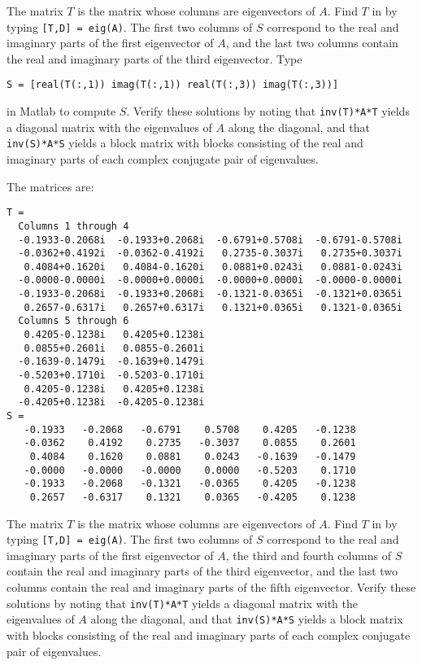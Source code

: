 \documentclass{ximera}
\begin{document}
\soln The matrix $T$ is the matrix whose columns are eigenvectors of $A$. 
Find $T$ in \Matlab by typing {\tt [T,D] = eig(A)}.  The first two columns
of $S$ correspond to the real and imaginary parts of the first eigenvector
of $A$, and the last two columns contain the real and imaginary parts of
the third eigenvector.  Type 
\begin{verbatim}
S = [real(T(:,1)) imag(T(:,1)) real(T(:,3)) imag(T(:,3))]   
\end{verbatim}
in Matlab to compute $S$.  Verify these solutions by noting that
{\tt inv(T)*A*T} yields a diagonal matrix with the eigenvalues of $A$
along the diagonal, and that {\tt inv(S)*A*S} yields a block matrix
with blocks consisting of the real and imaginary parts of each complex
conjugate pair of eigenvalues.

\newpage
{}
\ans The matrices are:
\begin{verbatim}
T =
  Columns 1 through 4 
  -0.1933-0.2068i  -0.1933+0.2068i  -0.6791+0.5708i  -0.6791-0.5708i
  -0.0362+0.4192i  -0.0362-0.4192i   0.2735-0.3037i   0.2735+0.3037i
   0.4084+0.1620i   0.4084-0.1620i   0.0881+0.0243i   0.0881-0.0243i
  -0.0000-0.0000i  -0.0000+0.0000i  -0.0000+0.0000i  -0.0000-0.0000i
  -0.1933-0.2068i  -0.1933+0.2068i  -0.1321-0.0365i  -0.1321+0.0365i
   0.2657-0.6317i   0.2657+0.6317i   0.1321+0.0365i   0.1321-0.0365i
  Columns 5 through 6 
   0.4205-0.1238i   0.4205+0.1238i
   0.0855+0.2601i   0.0855-0.2601i
  -0.1639-0.1479i  -0.1639+0.1479i
  -0.5203+0.1710i  -0.5203-0.1710i
   0.4205-0.1238i   0.4205+0.1238i
  -0.4205+0.1238i  -0.4205-0.1238i
S =
   -0.1933   -0.2068   -0.6791    0.5708    0.4205   -0.1238
   -0.0362    0.4192    0.2735   -0.3037    0.0855    0.2601
    0.4084    0.1620    0.0881    0.0243   -0.1639   -0.1479
   -0.0000   -0.0000   -0.0000    0.0000   -0.5203    0.1710
   -0.1933   -0.2068   -0.1321   -0.0365    0.4205   -0.1238
    0.2657   -0.6317    0.1321    0.0365   -0.4205    0.1238
\end{verbatim}

\soln The matrix $T$ is the matrix whose columns are eigenvectors of $A$. 
Find $T$ in \Matlab by typing {\tt [T,D] = eig(A)}.  The first two columns
of $S$ correspond to the real and imaginary parts of the first eigenvector
of $A$, the third and fourth columns of $S$ contain the real and imaginary parts of 
the third eigenvector, and the last two columns contain the real and imaginary 
parts of the fifth eigenvector.  Verify these solutions by noting that
{\tt inv(T)*A*T} yields a diagonal matrix with the eigenvalues of $A$
along the diagonal, and that {\tt inv(S)*A*S} yields a block matrix
with blocks consisting of the real and imaginary parts of each complex
conjugate pair of eigenvalues.
\end{document}
